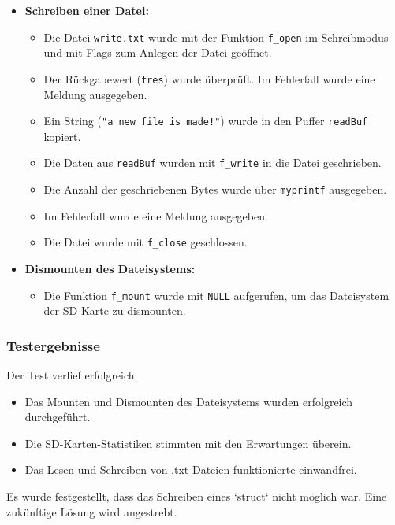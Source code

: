 \begin{itemize}
	\item \textbf{Schreiben einer Datei:}
	\begin{itemize}
		\item Die Datei \texttt{write.txt} wurde mit der Funktion \texttt{f\_open} im Schreibmodus und mit Flags zum Anlegen der Datei geöffnet.
		\item Der Rückgabewert (\texttt{fres}) wurde überprüft. Im Fehlerfall wurde eine Meldung ausgegeben.
		\item Ein String (\texttt{"a new file is made!"}) wurde in den Puffer \texttt{readBuf} kopiert.
		\item Die Daten aus \texttt{readBuf} wurden mit \texttt{f\_write} in die Datei geschrieben.
		\item Die Anzahl der geschriebenen Bytes wurde über \texttt{myprintf} ausgegeben.
		\item Im Fehlerfall wurde eine Meldung ausgegeben.
		\item Die Datei wurde mit \texttt{f\_close} geschlossen.
	\end{itemize}
	
	\item \textbf{Dismounten des Dateisystems:}
	\begin{itemize}
		\item Die Funktion \texttt{f\_mount} wurde mit \texttt{NULL} aufgerufen, um das Dateisystem der SD-Karte zu dismounten.
	\end{itemize}
\end{itemize}

\subsubsection{Testergebnisse}
Der Test verlief erfolgreich:

\begin{itemize}
	\item Das Mounten und Dismounten des Dateisystems wurden erfolgreich durchgeführt.
	\item Die SD-Karten-Statistiken stimmten mit den Erwartungen überein.
	\item Das Lesen und Schreiben von .txt Dateien funktionierte einwandfrei.
\end{itemize}

Es wurde festgestellt, dass das Schreiben eines `struct` nicht möglich war. Eine zukünftige Lösung wird angestrebt.
